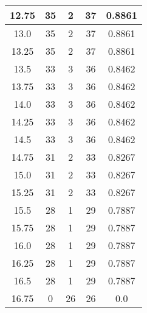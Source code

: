 \documentclass[letterpaper, 12pt]{article}
\begin{document}
\begin{longtable}{|c|c|c|c|c|}
\hline
12.75 & 35 & 2 & 37 & 0.8861 \\
\hline
13.0 & 35 & 2 & 37 & 0.8861 \\
\hline
13.25 & 35 & 2 & 37 & 0.8861 \\
\hline
13.5 & 33 & 3 & 36 & 0.8462 \\
\hline
13.75 & 33 & 3 & 36 & 0.8462 \\
\hline
14.0 & 33 & 3 & 36 & 0.8462 \\
\hline
14.25 & 33 & 3 & 36 & 0.8462 \\
\hline
14.5 & 33 & 3 & 36 & 0.8462 \\
\hline
14.75 & 31 & 2 & 33 & 0.8267 \\
\hline
15.0 & 31 & 2 & 33 & 0.8267 \\
\hline
15.25 & 31 & 2 & 33 & 0.8267 \\
\hline
15.5 & 28 & 1 & 29 & 0.7887 \\
\hline
15.75 & 28 & 1 & 29 & 0.7887 \\
\hline
16.0 & 28 & 1 & 29 & 0.7887 \\
\hline
16.25 & 28 & 1 & 29 & 0.7887 \\
\hline
16.5 & 28 & 1 & 29 & 0.7887 \\
\hline
16.75 & 0 & 26 & 26 & 0.0 \\
\hline
\end{longtable}
\end{document}
